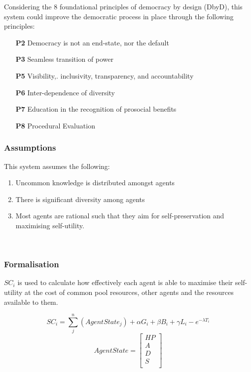 Considering the 8 foundational principles of democracy by design (DbyD), this system could improve the democratic process in place through the following principles: \cite{Jpitt}
    \begin{enumerate}
        \item[\textbf{P2}] Democracy is not an end-state, nor the default
        \item[\textbf{P3}]Seamless transition of power
        \item[\textbf{P5}] Visibility,. inclusivity, transparency, and accountability
        \item[\textbf{P6}] Inter-dependence of diversity 
        \item[\textbf{P7}] Education in the recognition of prosocial benefits
        \item[\textbf{P8}] Procedural Evaluation
    \end{enumerate}
\subsubsection{Assumptions}
This system assumes the following:

\begin{enumerate}
    \item Uncommon knowledge is distributed amongst agents
    \item There is significant diversity among agents
    \item Most agents are rational such that they aim for self-preservation and maximising self-utility.
\end{enumerate}\\

\subsubsection{Formalisation}
$SC_i$ is used to calculate how effectively each agent is able to maximise their self-utility at the cost of common pool resources, other agents and the resources available to them. 


$$SC_i = \sum_{j}^{n} (AgentState_j) + \alpha G_i + \beta B_i + \gamma L_i - e^{-\lambda T_i}$$
$$ AgentState = 
\begin{bmatrix}
HP\\
A\\
D \\
S \\
\end{bmatrix}
$$

